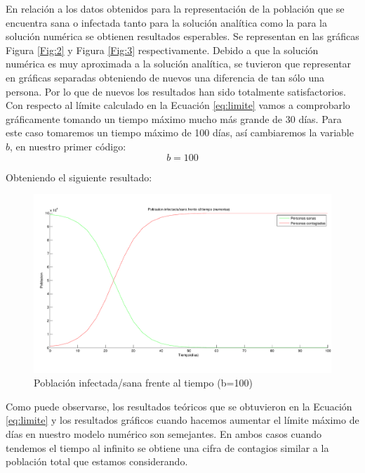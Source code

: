 \documentclass[a4paper,11pt]{article}
\numberwithin{equation}{section}
\begin{document}
\indent En relación a los datos obtenidos para la representación de la población que se encuentra sana o infectada tanto para la solución analítica como la para la solución numérica se obtienen resultados esperables. Se representan en las gráficas Figura \ref{Fig:2} y Figura \ref{Fig:3} respectivamente. Debido a que la solución numérica es muy aproximada a la solución analítica, se tuvieron que representar en gráficas separadas obteniendo de nuevos una diferencia de tan sólo una persona. Por lo que de nuevos los resultados han sido totalmente satisfactorios. \\

\indent Con respecto al límite calculado en la Ecuación \ref{eq:limite} vamos a comprobarlo gráficamente tomando un tiempo máximo mucho más grande de 30 días. Para este caso tomaremos un tiempo máximo de 100 días, así cambiaremos la variable $ b $, en nuestro primer código:
\begin{equation}
b=100
\end{equation} 

\indent Obteniendo el siguiente resultado:
\begin{figure}[h!]
	\centering 		
	\includegraphics[width=1\textwidth]{grafica7.pdf}
	\caption{Población infectada/sana frente al tiempo (b=100)}
	\label{Fig:7}
\end{figure}

\indent Como puede observarse, los resultados teóricos que se obtuvieron en la Ecuación \ref{eq:limite} y los resultados gráficos cuando hacemos aumentar el límite máximo de días en nuestro modelo numérico son semejantes. En ambos casos cuando tendemos el tiempo al infinito se obtiene una cifra de contagios similar a la población total que estamos considerando.
\end{document}
